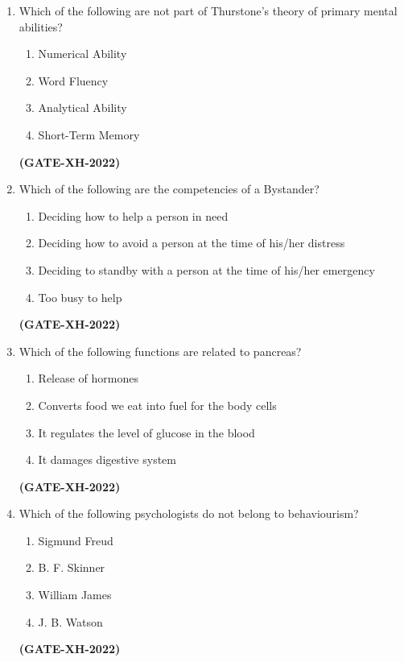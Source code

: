 \documentclass[journal]{IEEEtran}
\begin{document}
\begin{enumerate}
\item
Which of the following are not part of Thurstone’s theory of primary mental abilities? 
\begin{multicols}{2}
\begin{enumerate}
\item Numerical Ability 
\item Word Fluency 
\item Analytical Ability 
\item Short-Term Memory 
\end{enumerate}
\end{multicols}
\hfill\textbf{(GATE-XH-2022)}

\item
Which of the following are the competencies of a Bystander? 
\begin{enumerate}
\item Deciding how to help a person in need 
\item Deciding how to avoid a person at the time of his/her distress 
\item Deciding to standby with a person at the time of his/her emergency  
\item Too busy to help 
\end{enumerate}
\hfill\textbf{(GATE-XH-2022)}

\item
Which of the following functions are related to pancreas? \\
\begin{enumerate}
\item Release of hormones  
\item Converts food we eat into fuel for the body cells 
\item It regulates the level of glucose in the blood 
\item It damages digestive system 
\end{enumerate}
\hfill\textbf{(GATE-XH-2022)}

\item
Which of the following psychologists do not belong to behaviourism? 
\begin{multicols}{4}
\begin{enumerate}
\item Sigmund Freud 
\item B. F. Skinner 
\item William James 
\item J. B. Watson
\end{enumerate}
\end{multicols}
\hfill\textbf{(GATE-XH-2022)}


\end{enumerate}
\end{document}
